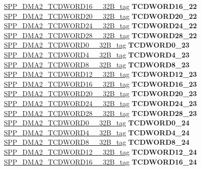 \begin{DoxyCompactItemize}
\begin{tabbing}
\>\>\mbox{\hyperlink{unionSPP__DMA2__TCDWORD16____32B__tag}{SPP\_DMA2\_TCDWORD16\_\_32B\_tag}} {\bfseries TCDWORD16\_22}\\
\>\>\mbox{\hyperlink{unionSPP__DMA2__TCDWORD20____32B__tag}{SPP\_DMA2\_TCDWORD20\_\_32B\_tag}} {\bfseries TCDWORD20\_22}\\
\>\>\mbox{\hyperlink{unionSPP__DMA2__TCDWORD24____32B__tag}{SPP\_DMA2\_TCDWORD24\_\_32B\_tag}} {\bfseries TCDWORD24\_22}\\
\>\>\mbox{\hyperlink{unionSPP__DMA2__TCDWORD28____32B__tag}{SPP\_DMA2\_TCDWORD28\_\_32B\_tag}} {\bfseries TCDWORD28\_22}\\
\>\>\mbox{\hyperlink{unionSPP__DMA2__TCDWORD0____32B__tag}{SPP\_DMA2\_TCDWORD0\_\_32B\_tag}} {\bfseries TCDWORD0\_23}\\
\>\>\mbox{\hyperlink{unionSPP__DMA2__TCDWORD4____32B__tag}{SPP\_DMA2\_TCDWORD4\_\_32B\_tag}} {\bfseries TCDWORD4\_23}\\
\>\>\mbox{\hyperlink{unionSPP__DMA2__TCDWORD8____32B__tag}{SPP\_DMA2\_TCDWORD8\_\_32B\_tag}} {\bfseries TCDWORD8\_23}\\
\>\>\mbox{\hyperlink{unionSPP__DMA2__TCDWORD12____32B__tag}{SPP\_DMA2\_TCDWORD12\_\_32B\_tag}} {\bfseries TCDWORD12\_23}\\
\>\>\mbox{\hyperlink{unionSPP__DMA2__TCDWORD16____32B__tag}{SPP\_DMA2\_TCDWORD16\_\_32B\_tag}} {\bfseries TCDWORD16\_23}\\
\>\>\mbox{\hyperlink{unionSPP__DMA2__TCDWORD20____32B__tag}{SPP\_DMA2\_TCDWORD20\_\_32B\_tag}} {\bfseries TCDWORD20\_23}\\
\>\>\mbox{\hyperlink{unionSPP__DMA2__TCDWORD24____32B__tag}{SPP\_DMA2\_TCDWORD24\_\_32B\_tag}} {\bfseries TCDWORD24\_23}\\
\>\>\mbox{\hyperlink{unionSPP__DMA2__TCDWORD28____32B__tag}{SPP\_DMA2\_TCDWORD28\_\_32B\_tag}} {\bfseries TCDWORD28\_23}\\
\>\>\mbox{\hyperlink{unionSPP__DMA2__TCDWORD0____32B__tag}{SPP\_DMA2\_TCDWORD0\_\_32B\_tag}} {\bfseries TCDWORD0\_24}\\
\>\>\mbox{\hyperlink{unionSPP__DMA2__TCDWORD4____32B__tag}{SPP\_DMA2\_TCDWORD4\_\_32B\_tag}} {\bfseries TCDWORD4\_24}\\
\>\>\mbox{\hyperlink{unionSPP__DMA2__TCDWORD8____32B__tag}{SPP\_DMA2\_TCDWORD8\_\_32B\_tag}} {\bfseries TCDWORD8\_24}\\
\>\>\mbox{\hyperlink{unionSPP__DMA2__TCDWORD12____32B__tag}{SPP\_DMA2\_TCDWORD12\_\_32B\_tag}} {\bfseries TCDWORD12\_24}\\
\>\>\mbox{\hyperlink{unionSPP__DMA2__TCDWORD16____32B__tag}{SPP\_DMA2\_TCDWORD16\_\_32B\_tag}} {\bfseries TCDWORD16\_24}\\

\end{tabbing}
\end{DoxyCompactItemize}
